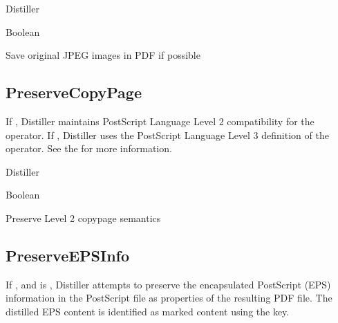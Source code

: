 \documentclass[letterpaper,12pt,english,openany,oneside]{sphinxmanual}
\begin{document}
Distiller

\label{\detokenize{PDF_Create_CommonSettings:type-100}}

Boolean

\label{\detokenize{PDF_Create_CommonSettings:ui-name-83}}

Save original JPEG images in PDF if possible

\label{\detokenize{PDF_Create_CommonSettings:default-value-95}}

\begin{sphinxVerbatim}[commandchars=\\\{\}]
\end{sphinxVerbatim}


\subsection{PreserveCopyPage}
\label{\detokenize{PDF_Create_CommonSettings:preservecopypage}}\label{\detokenize{PDF_Create_CommonSettings:default-value-96}}

\begin{sphinxVerbatim}[commandchars=\\\{\}]
\end{sphinxVerbatim}

If  , Distiller maintains PostScript Language Level 2 compatibility for the  operator. If  , Distiller uses the PostScript Language Level 3 definition of the  operator. See the  for more information.

\label{\detokenize{PDF_Create_CommonSettings:supported-by-102}}

Distiller

\label{\detokenize{PDF_Create_CommonSettings:type-101}}

Boolean

\label{\detokenize{PDF_Create_CommonSettings:ui-name-84}}

Preserve Level 2 copypage semantics




\subsection{PreserveEPSInfo}
\label{\detokenize{PDF_Create_CommonSettings:preserveepsinfo}}
If  , and  is  , Distiller attempts to preserve the encapsulated PostScript (EPS) information in the PostScript file as properties of the resulting PDF file. The distilled EPS content is identified as marked content using the  key.
\end{document}
